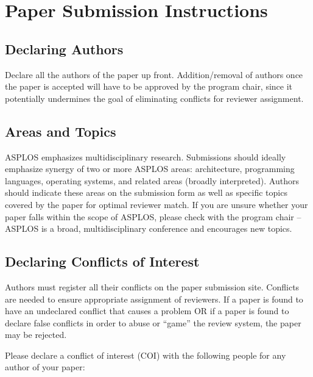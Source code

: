 \documentclass[pageno]{jpaper}
\begin{document}
\section{Paper Submission Instructions}

\subsection{Declaring Authors}

Declare all the authors of the paper up front. Addition/removal of authors
once the paper is accepted will have to be approved by the program chair,
since it potentially undermines the goal of eliminating conflicts for
reviewer assignment.

\subsection{Areas and Topics}

ASPLOS emphasizes multidisciplinary research. Submissions should ideally
emphasize synergy of two or more ASPLOS areas: architecture, programming
languages, operating systems, and related areas (broadly
interpreted). Authors should indicate these areas on the submission form as
well as specific topics covered by the paper for optimal reviewer match. If
you are unsure whether your paper falls within the scope of ASPLOS, please
check with the program chair -- ASPLOS is a broad, multidisciplinary
conference and encourages new topics.

\subsection{Declaring Conflicts of Interest}

Authors must register all their conflicts on the paper submission site.
Conflicts are needed to ensure appropriate assignment of reviewers.  
If a paper is found to have an undeclared conflict that causes
a problem OR if a paper is found to declare false conflicts in order to
abuse or ``game'' the review system, the paper may be rejected.

Please declare a conflict of interest (COI) with the following people 
for any author of your paper:
\end{document}
